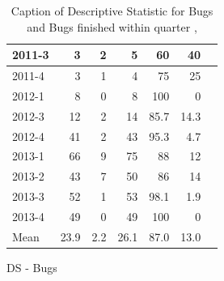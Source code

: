 \documentclass[UKenglish]{ifimaster}  %
\begin{document}
\begin{appendices}
\begin{table}[!htbp]
\begin{adjustwidth}{-3cm}{}
\begin{subfigure}[b]{0.4\textwidth}
{\begin{tabular}{ | l | r | r | r | r | r | r | }
2011-3 & 3 & 2 & 5 & 60 & 40 \\ \hline
2011-4 & 3 & 1 & 4 & 75 & 25 \\ \hline
2012-1 & 8 & 0 & 8 & 100 & 0 \\ \hline
2012-3 & 12 & 2 & 14 & 85.7 & 14.3 \\ \hline
2012-4 & 41 & 2 & 43 & 95.3 & 4.7 \\ \hline
2013-1 & 66 & 9 & 75 & 88 & 12 \\ \hline
2013-2 & 43 & 7 & 50 & 86 & 14 \\ \hline
2013-3 & 52 & 1 & 53 & 98.1 & 1.9 \\ \hline
2013-4 & 49 & 0 & 49 & 100 & 0 \\ \hline
Mean & 23.9&2.2&26.1&87.0&13.0 \\ \hline
\end{tabular}
}
\caption{DS - Bugs}
 \label{DS:FTPQ:6}
\end{subfigure}
\end{adjustwidth}
\caption[Optional caption for list of figures]{Caption of Descriptive Statistic for Bugs and Bugs finished within quarter  , }
\label{DS:6:5} %
\end{table}


 
 
 

\end{appendices}
\end{document}
